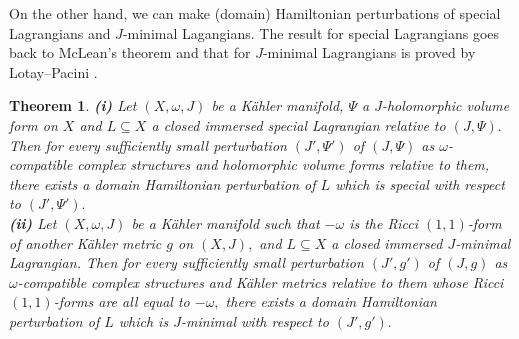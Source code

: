 \documentclass{article}
\theoremstyle{plain}%
\newtheorem{thm}{Theorem}[section]
\theoremstyle{definition}
\numberwithin{equation}{section}
\numberwithin{figure}{section}
\def\l{\label}
\def\om{\omega}
\def\Ps{\Psi}
\def\sb{\subseteq}
\begin{document}
On the other hand, we can make (domain) Hamiltonian perturbations of special Lagrangians
and $J$-minimal Lagangians.
The result for special Lagrangians goes back to McLean's theorem \cite{ML}
and that for $J$-minimal Lagrangians is proved by Lotay--Pacini \cite[Theorem 5.6]{LP}.
\begin{thm}\l{HamPert1}
{\bf(i)}
Let $(X,\om,J)$ be a K\"ahler manifold, $\Ps$ a $J$-holomorphic volume form on $X$
and $L\sb X$ a closed immersed special Lagrangian relative to $(J,\Ps).$ 
Then for every sufficiently small perturbation $(J',\Ps')$ of $(J,\Ps)$ as $\om$-compatible complex structures and holomorphic volume forms relative to them,
there exists a domain Hamiltonian perturbation of $L$ which is special with respect to $(J',\Ps').$
\\{\bf(ii)}
Let $(X,\om,J)$ be a K\"ahler manifold such that $-\om$ is the Ricci $(1,1)$-form of another K\"ahler metric $g$ on $(X,J),$
and  $L\sb X$ a closed immersed $J$-minimal Lagrangian. 
Then for every sufficiently small perturbation $(J',g')$ of $(J,g)$ as $\om$-compatible complex structures and K\"ahler metrics relative to them
whose Ricci $(1,1)$-forms are all equal to $-\om,$
there exists a domain Hamiltonian perturbation of $L$ which is $J$-minimal with respect to $(J',g').$
\end{thm}
\end{document}
